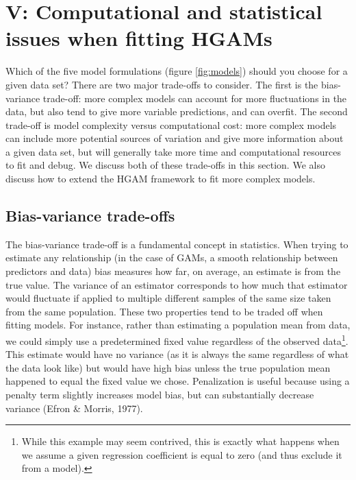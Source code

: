 \documentclass[12pt]{article}
\let\rmarkdownfootnote\footnote%
\def\footnote{\protect\rmarkdownfootnote}
\begin{document}
\FloatBarrier

\section{V: Computational and statistical issues when fitting
HGAMs}\label{v-computational-and-statistical-issues-when-fitting-hgams}

Which of the five model formulations (figure \ref{fig:models}) should
you choose for a given data set? There are two major trade-offs to
consider. The first is the bias-variance trade-off: more complex models
can account for more fluctuations in the data, but also tend to give
more variable predictions, and can overfit. The second trade-off is
model complexity versus computational cost: more complex models can
include more potential sources of variation and give more information
about a given data set, but will generally take more time and
computational resources to fit and debug. We discuss both of these
trade-offs in this section. We also discuss how to extend the HGAM
framework to fit more complex models.

\subsection{Bias-variance trade-offs}\label{bias-variance-trade-offs}

The bias-variance trade-off is a fundamental concept in statistics. When
trying to estimate any relationship (in the case of GAMs, a smooth
relationship between predictors and data) bias measures how far, on
average, an estimate is from the true value. The variance of an
estimator corresponds to how much that estimator would fluctuate if
applied to multiple different samples of the same size taken from the
same population. These two properties tend to be traded off when fitting
models. For instance, rather than estimating a population mean from
data, we could simply use a predetermined fixed value regardless of the
observed data\footnote{While this example may seem contrived, this is
  exactly what happens when we assume a given regression coefficient is
  equal to zero (and thus exclude it from a model).}. This estimate
would have no variance (as it is always the same regardless of what the
data look like) but would have high bias unless the true population mean
happened to equal the fixed value we chose. Penalization is useful
because using a penalty term slightly increases model bias, but can
substantially decrease variance (Efron \& Morris, 1977).
\end{document}
